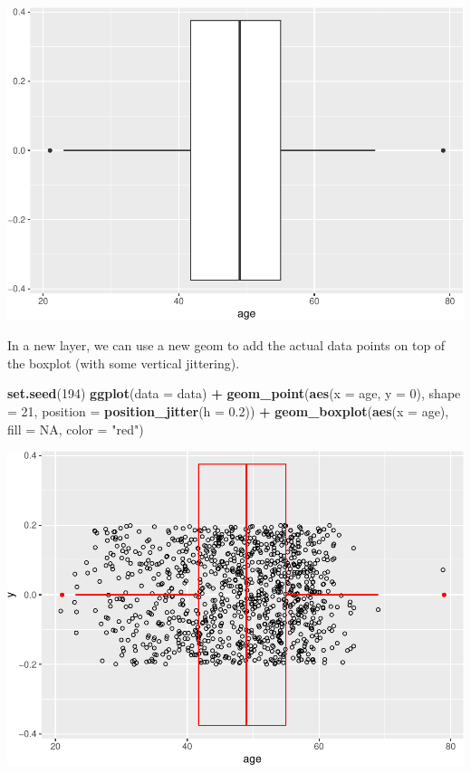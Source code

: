 \documentclass[
]{book}
\newenvironment{Shaded}{\begin{snugshade}}{\end{snugshade}}
\newcommand{\AttributeTok}[1]{\textcolor[rgb]{0.13,0.29,0.53}{#1}}
\newcommand{\ConstantTok}[1]{\textcolor[rgb]{0.56,0.35,0.01}{#1}}
\newcommand{\DecValTok}[1]{\textcolor[rgb]{0.00,0.00,0.81}{#1}}
\newcommand{\FloatTok}[1]{\textcolor[rgb]{0.00,0.00,0.81}{#1}}
\newcommand{\FunctionTok}[1]{\textcolor[rgb]{0.13,0.29,0.53}{\textbf{#1}}}
\newcommand{\NormalTok}[1]{#1}
\newcommand{\SpecialCharTok}[1]{\textcolor[rgb]{0.81,0.36,0.00}{\textbf{#1}}}
\newcommand{\StringTok}[1]{\textcolor[rgb]{0.31,0.60,0.02}{#1}}
\begin{document}
\includegraphics{R-for-social-research-and-business-analytics_files/figure-latex/unnamed-chunk-23-1.pdf}

In a new layer, we can use a new geom to add the actual data points on top of the boxplot (with some vertical jittering).

\begin{Shaded}
\begin{Highlighting}[]
\FunctionTok{set.seed}\NormalTok{(}\DecValTok{194}\NormalTok{)}
\FunctionTok{ggplot}\NormalTok{(}\AttributeTok{data =}\NormalTok{ data) }\SpecialCharTok{+}
  \FunctionTok{geom\_point}\NormalTok{(}\FunctionTok{aes}\NormalTok{(}\AttributeTok{x =}\NormalTok{ age, }\AttributeTok{y =} \DecValTok{0}\NormalTok{), }
             \AttributeTok{shape =} \DecValTok{21}\NormalTok{,}
             \AttributeTok{position =} \FunctionTok{position\_jitter}\NormalTok{(}\AttributeTok{h =} \FloatTok{0.2}\NormalTok{)) }\SpecialCharTok{+}
  \FunctionTok{geom\_boxplot}\NormalTok{(}\FunctionTok{aes}\NormalTok{(}\AttributeTok{x =}\NormalTok{ age), }\AttributeTok{fill =} \ConstantTok{NA}\NormalTok{, }\AttributeTok{color =} \StringTok{"red"}\NormalTok{)}
\end{Highlighting}
\end{Shaded}

\includegraphics{R-for-social-research-and-business-analytics_files/figure-latex/unnamed-chunk-24-1.pdf}
\end{document}
